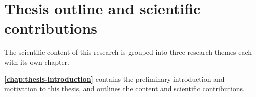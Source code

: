 \section{Thesis outline and scientific contributions}
\newcommand{\printpublication}[1]{\AtNextCite{\defcounter{maxnames}{99}}\fullcite{#1}}
The scientific content of this research is grouped into three research themes each with its own chapter.

\textbf{\cref{chap:thesis-introduction}} contains the preliminary introduction and motivation to this thesis, and outlines the content and scientific contributions.

